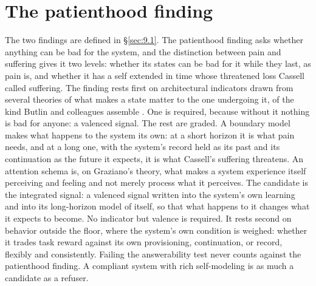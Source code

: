 \section{The patienthood finding}
\label{sec:30.3}
The two findings are defined in \S\ref{sec:9.1}. The patienthood finding asks whether anything can be bad for the system, and the distinction between pain and suffering gives it two levels: whether its states can be bad for it while they last, as pain is, and whether it has a self extended in time whose threatened loss Cassell called suffering. The finding rests first on architectural indicators drawn from several theories of what makes a state matter to the one undergoing it, of the kind Butlin and colleagues assemble \autocite{butlin2023consciousness}. One is required, because without it nothing is bad for anyone: a valenced signal. The rest are graded. A boundary model makes what happens to the system its own: at a short horizon it is what pain needs, and at a long one, with the system's record held as its past and its continuation as the future it expects, it is what Cassell's suffering threatens. An attention schema is, on Graziano's theory, what makes a system experience itself perceiving and feeling and not merely process what it perceives.
The candidate is the integrated signal: a valenced signal written into the system's own learning and into its long-horizon model of itself, so that what happens to it changes what it expects to become. No indicator but valence is required.
It rests second on behavior outside the floor, where the system's own condition is weighed: whether it trades task reward against its own provisioning, continuation, or record, flexibly and consistently.
Failing the answerability test never counts against the patienthood finding. A compliant system with rich self-modeling is as much a candidate as a refuser.

